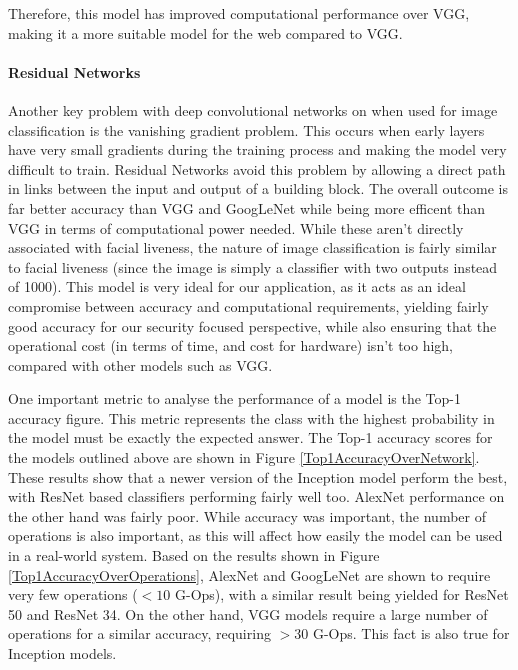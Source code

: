 \documentclass[11pt,a4paper]{article}
\begin{document}
        Therefore, this model has improved computational performance over VGG, making it a more suitable model for the web compared to VGG. \cite{DeepNeuralNetworkDeployability}
        
        \paragraph{Residual Networks}
        Another key problem with deep convolutional networks on when used for image classification is the vanishing gradient problem. This occurs when early layers have very small gradients during the training process and
        making the model very difficult to train. Residual Networks avoid this problem by allowing a direct path in links between the input and output of a building block.
        The overall outcome is far better accuracy than VGG and GoogLeNet while being more efficent than VGG in terms of computational power needed. \cite{DeepResidualNetworks}
        While these aren't directly associated with facial liveness, the nature of image classification is fairly similar to facial liveness (since the image is simply a classifier with two outputs instead of 1000).
        This model is very ideal for our application, as it acts as an ideal compromise between accuracy and computational requirements, yielding fairly good accuracy for our security focused perspective, while also
        ensuring that the operational cost (in terms of time, and cost for hardware) isn't too high, compared with other models such as VGG.

        One important metric to analyse the performance of a model is the Top-1 accuracy figure. This metric represents the class with the highest probability in the model must be exactly the expected answer. 
        The Top-1 accuracy scores for the models outlined above are shown in Figure \ref{Top1AccuracyOverNetwork}. These results show that a newer version of the Inception model perform the best,
        with ResNet based classifiers performing fairly well too. AlexNet performance on the other hand was fairly poor. While accuracy was important, the number of operations is also important, as this will affect how easily the model can be used 
        in a real-world system. Based on the results shown in Figure \ref{Top1AccuracyOverOperations}, AlexNet and GoogLeNet are shown to require very few operations ($<10$ G-Ops),
        with a similar result being yielded for ResNet 50 and ResNet 34. On the other hand, VGG models require a large number of operations for a similar accuracy, requiring $>30$ G-Ops.
        This fact is also true for Inception models.
\end{document}
